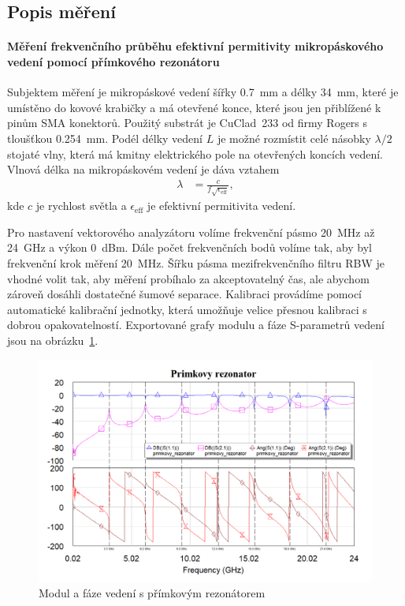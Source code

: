 \documentclass[11pt,a4paper]{article}
\begin{document}
\subsection*{Popis měření}

\paragraph*{Měření frekvenčního průběhu efektivní permitivity mikropáskového vedení pomocí přímkového rezonátoru} Subjektem měření je mikropáskové vedení šířky 0.7~mm a délky 34~mm, které je umístěno do kovové krabičky a má otevřené konce, které jsou jen přiblížené k pinům SMA konektorů. Použitý substrát je CuClad\textregistered\ 233 od firmy Rogers s tloušťkou 0.254~mm. Podél délky vedení $L$ je možné rozmístit celé násobky $\lambda/2$ stojaté vlny, která má kmitny elektrického pole na otevřených koncích vedení. Vlnová délka na mikropáskovém vedení je dáva vztahem
\begin{align}
    \lambda &= \frac{c}{f\sqrt{\epsilon_{\mathrm{eff}}}},
\end{align}
kde $c$ je rychlost světla a $\epsilon_{\mathrm{eff}}$ je efektivní permitivita vedení.

Pro nastavení vektorového analyzátoru volíme frekvenční pásmo 20~MHz až 24~GHz a výkon 0~dBm. Dále počet frekvenčních bodů volíme tak, aby byl frekvenční krok měření 20~MHz. Šířku pásma mezifrekvenčního filtru RBW je vhodné volit tak, aby měření probíhalo za akceptovatelný čas, ale abychom zároveň dosáhli dostatečné šumové separace. Kalibraci provádíme pomocí automatické kalibrační jednotky, která umožňuje velice přesnou kalibraci s dobrou opakovatelností. Exportované grafy modulu a fáze S-parametrů vedení jsou na obrázku~\ref{fig:primkovy-rezonator}.
\begin{figure}[!ht]
\centering
\includegraphics[width=.9\textwidth]{src/primkovy-rezonator.png}
\caption{Modul a fáze vedení s přímkovým rezonátorem}
\label{fig:primkovy-rezonator}
\end{figure}
\end{document}

